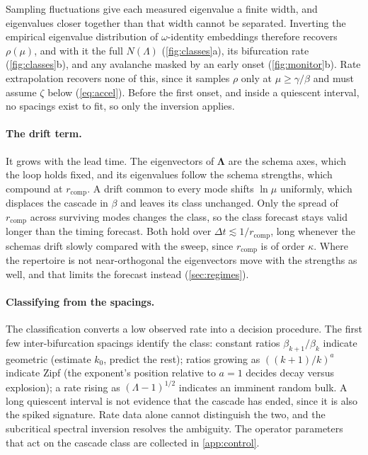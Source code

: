 \documentclass[
  aps,prx,
  reprint,
  superscriptaddress,
  nofootinbib,
  longbibliography
]{revtex4-2}
\newcommand{\Lam}{\bm{\Lambda}}
\newcommand{\rcomp}{r_{\mathrm{comp}}}
\begin{document}
Sampling fluctuations give each measured eigenvalue a finite width, and eigenvalues closer together than that width cannot be separated. Inverting the empirical eigenvalue distribution of $\omega$-identity embeddings therefore recovers $\rho(\mu)$, and with it the full $N(\Lambda)$ (\cref{fig:classes}a), its bifurcation rate (\cref{fig:classes}b), and any avalanche masked by an early onset (\cref{fig:monitor}b). Rate extrapolation recovers none of this, since it samples $\rho$ only at $\mu\ge\gamma/\beta$ and must assume $\zeta$ below (\cref{eq:accel}). Before the first onset, and inside a quiescent interval, no spacings exist to fit, so only the inversion applies.

\paragraph{The drift term.} It grows with the lead time. The eigenvectors of $\Lam$ are the schema axes, which the loop holds fixed, and its eigenvalues follow the schema strengths, which compound at $\rcomp$. A drift common to every mode shifts $\ln\mu$ uniformly, which displaces the cascade in $\beta$ and leaves its class unchanged. Only the spread of $\rcomp$ across surviving modes changes the class, so the class forecast stays valid longer than the timing forecast. Both hold over $\Delta t\lesssim1/\rcomp$, long whenever the schemas drift slowly compared with the sweep, since $\rcomp$ is of order $\kappa$. Where the repertoire is not near-orthogonal the eigenvectors move with the strengths as well, and that limits the forecast instead (\cref{sec:regimes}).

\paragraph{Classifying from the spacings.} The classification converts a low observed rate into a decision procedure. The first few inter-bifurcation spacings identify the class: constant ratios $\beta_{k+1}/\beta_k$ indicate geometric (estimate $k_0$, predict the rest); ratios growing as $((k{+}1)/k)^a$ indicate Zipf (the exponent's position relative to $a=1$ decides decay versus explosion); a rate rising as $(\Lambda-1)^{1/2}$ indicates an imminent random bulk. A long quiescent interval is not evidence that the cascade has ended, since it is also the spiked signature. Rate data alone cannot distinguish the two, and the subcritical spectral inversion resolves the ambiguity. The operator parameters that act on the cascade class are collected in \cref{app:control}.
\end{document}

